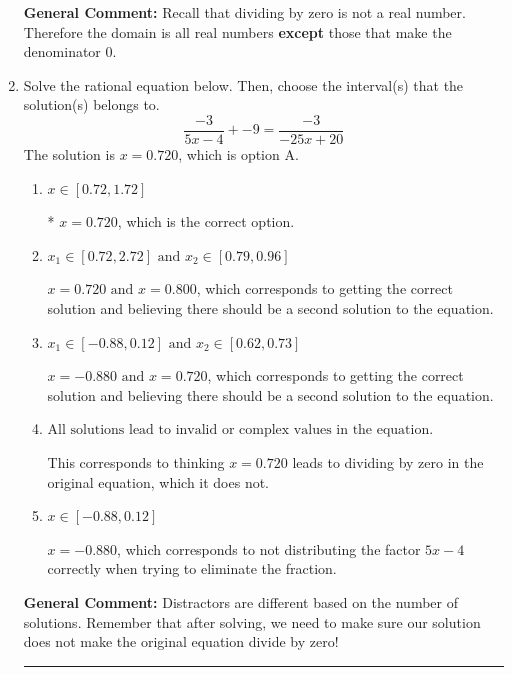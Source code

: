 \documentclass{extbook}[14pt]
\newcommand{\litem}[1]{\item #1

\rule{\textwidth}{0.4pt}}
\begin{document}
\begin{enumerate}
{\textbf{General Comment:} Recall that dividing by zero is not a real number. Therefore the domain is all real numbers \textbf{except} those that make the denominator 0.
}
\litem{
Solve the rational equation below. Then, choose the interval(s) that the solution(s) belongs to.
\[ \frac{-3}{5x -4} + -9 = \frac{-3}{-25x + 20} \]
The solution is \( x = 0.720 \), which is option A.\begin{enumerate}[label=\Alph*.]
\item \( x \in [0.72,1.72] \)

* $x = 0.720$, which is the correct option.
\item \( x_1 \in [0.72, 2.72] \text{ and } x_2 \in [0.79,0.96] \)

$x = 0.720 \text{ and } x = 0.800$, which corresponds to getting the correct solution and believing there should be a second solution to the equation.
\item \( x_1 \in [-0.88, 0.12] \text{ and } x_2 \in [0.62,0.73] \)

$x = -0.880 \text{ and } x = 0.720$, which corresponds to getting the correct solution and believing there should be a second solution to the equation.
\item \( \text{All solutions lead to invalid or complex values in the equation.} \)

This corresponds to thinking $x = 0.720$ leads to dividing by zero in the original equation, which it does not.
\item \( x \in [-0.88,0.12] \)

$x = -0.880$, which corresponds to not distributing the factor $5x -4$ correctly when trying to eliminate the fraction.
\end{enumerate}

\textbf{General Comment:} Distractors are different based on the number of solutions. Remember that after solving, we need to make sure our solution does not make the original equation divide by zero!
}
\end{enumerate}
\end{document}
